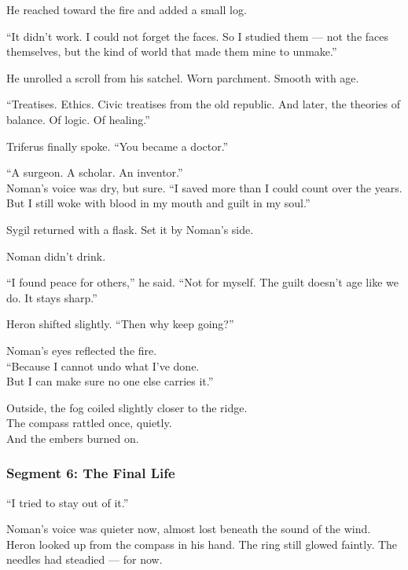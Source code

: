 \documentclass[9pt]{article}
\begin{document}
He reached toward the fire and added a small log.

“It didn’t work. I could not forget the faces. So I studied them — not the faces themselves, but the kind of world that made them mine to unmake.”

\vspace{1em}

He unrolled a scroll from his satchel. Worn parchment. Smooth with age.

“Treatises. Ethics. Civic treatises from the old republic. And later, the theories of balance. Of logic. Of healing.”

Triferus finally spoke. “You became a doctor.”

“A surgeon. A scholar. An inventor.”\\
Noman’s voice was dry, but sure. “I saved more than I could count over the years. But I still woke with blood in my mouth and guilt in my soul.”

\vspace{1em}

Sygil returned with a flask. Set it by Noman’s side.

Noman didn’t drink.

“I found peace for others,” he said. “Not for myself. The guilt doesn’t age like we do. It stays sharp.”

Heron shifted slightly. “Then why keep going?”

\vspace{1em}

Noman’s eyes reflected the fire.\\
“Because I cannot undo what I’ve done.\\
But I can make sure no one else carries it.”

\vspace{1em}

Outside, the fog coiled slightly closer to the ridge.\\
The compass rattled once, quietly.\\
And the embers burned on.

\newpage

\subsubsection*{Segment 6: The Final Life}

“I tried to stay out of it.”

Noman’s voice was quieter now, almost lost beneath the sound of the wind.\\
Heron looked up from the compass in his hand. The ring still glowed faintly. The needles had steadied — for now.
\end{document}

